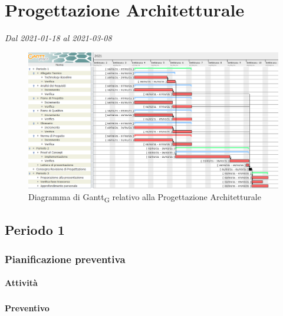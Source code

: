 \section{Progettazione Architetturale}
\textit{Dal 2021-01-18 al 2021-03-08}


\begin{figure}[H]
	\centering
	\includegraphics[scale=0.48]{res/images/gantt_fase/03_gantt_progettazione.png}
	\caption{Diagramma di Gantt\textsubscript{G} relativo alla Progettazione Architetturale}
\end{figure}


\subsection{Periodo 1}

\subsubsection{Pianificazione preventiva}

\paragraph{Attività}
\subparagraph*{}

\planningTable{
	
}

\paragraph{Preventivo}
\subparagraph*{}

